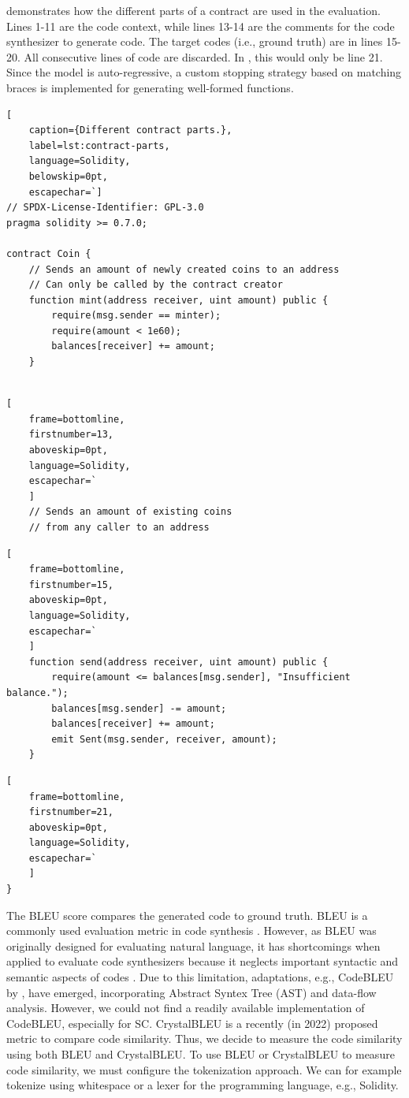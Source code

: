 \documentclass[12pt]{book}
\begin{document}
 demonstrates how the different parts of a contract are used in the evaluation. Lines 1-11 are the code context, while lines 13-14 are the comments for the code synthesizer to generate code. The target codes (i.e., ground truth) are in lines 15-20. All consecutive lines of code are discarded. In , 
this would only be line 21. Since the model is auto-regressive, a custom stopping strategy based on matching braces is implemented for generating well-formed functions.


\begin{lstlisting}[
    caption={Different contract parts.},
    label=lst:contract-parts,
    language=Solidity,
    belowskip=0pt,
    escapechar=`]
// SPDX-License-Identifier: GPL-3.0
pragma solidity >= 0.7.0;

contract Coin {
    // Sends an amount of newly created coins to an address
    // Can only be called by the contract creator
    function mint(address receiver, uint amount) public {
        require(msg.sender == minter);
        require(amount < 1e60);
        balances[receiver] += amount;
    }
    
\end{lstlisting}
\begin{lstlisting}[
    frame=bottomline,
    firstnumber=13,
    aboveskip=0pt,
    language=Solidity,
    escapechar=`
    ]
    // Sends an amount of existing coins
    // from any caller to an address
\end{lstlisting}
\begin{lstlisting}[
    frame=bottomline,
    firstnumber=15,
    aboveskip=0pt,
    language=Solidity,
    escapechar=`
    ]
    function send(address receiver, uint amount) public {
        require(amount <= balances[msg.sender], "Insufficient balance.");
        balances[msg.sender] -= amount;
        balances[receiver] += amount;
        emit Sent(msg.sender, receiver, amount);
    }
\end{lstlisting}
\begin{lstlisting}[
    frame=bottomline,
    firstnumber=21,
    aboveskip=0pt,
    language=Solidity,
    escapechar=`
    ]
}
\end{lstlisting}

The BLEU score compares the generated code to ground truth. BLEU is a commonly used evaluation metric in code synthesis \cite{ren2020codebleu}. However, as BLEU was originally designed for evaluating natural language, it has shortcomings when applied to evaluate code synthesizers because it neglects important syntactic and semantic aspects of codes \cite{ren2020codebleu}. Due to this limitation, adaptations, e.g., CodeBLEU by \cite{ren2020codebleu}, have emerged, incorporating Abstract Syntex Tree (AST) and data-flow analysis. However, we could not find a readily available implementation of CodeBLEU, especially for SC. CrystalBLEU \cite{CrystalBLEU} is a recently (in 2022) proposed metric to compare code similarity. Thus, we decide to measure the code similarity using both BLEU and CrystalBLEU. To use BLEU or CrystalBLEU to measure code similarity, we must configure the tokenization approach. We can for example tokenize using whitespace or a lexer for the programming language, e.g., Solidity.
\end{document}
